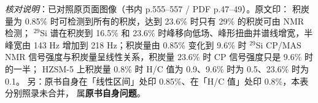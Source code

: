 \emph{核对说明}：已对照原页面图像（书内 p.555--557 / PDF p.47--49）。原文印：
积炭量为 0.85\% 时可检测到所有的积炭，达到 23.6\% 时只有 29\% 的积炭可由 NMR 检测；
$^{29}$Si 谱在积炭到 16.5\% 和 23.6\% 时峰移向低场、峰形扭曲并谱线增宽，半峰宽由 143
Hz 增加到 218 Hz；积炭量由 0.85\% 变化到 9.6\% 时 $^{29}$Si CP/MAS
NMR 信号强度与积炭量呈线性关系，积炭量 23.6\% 时 CP 信号强度只是 9.6\% 时的一半；
HZSM-5 上积炭量 0.8\% 时 H/C 值为 0.9、9.6\% 时为 0.5、23.6\% 时为 0.1。
另：原书自身在「线性区间」处印 0.85\%、在「H/C 值」处印 0.8\%，本表分别照录未合并，
属\textbf{原书自身问题}。

